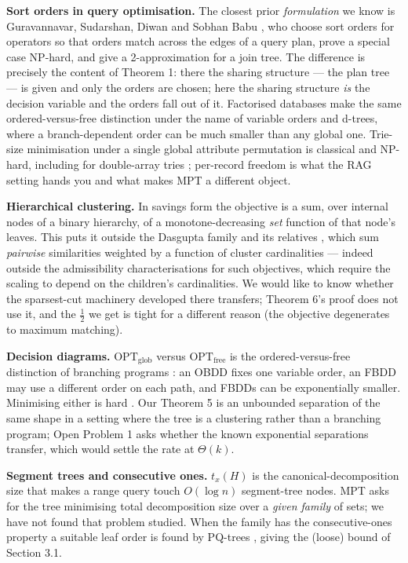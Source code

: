 \documentclass[11pt]{article}
\theoremstyle{plain}
\begin{document}
\textbf{Sort orders in query optimisation.} The closest prior \emph{formulation} we know is Guravannavar, Sudarshan, Diwan and Sobhan Babu \cite{GSD06}, who choose sort orders for operators so that orders match across the edges of a query plan, prove a special case NP-hard, and give a 2-approximation for a join tree. The difference is precisely the content of Theorem 1: there the sharing structure --- the plan tree --- is given and only the orders are chosen; here the sharing structure \emph{is} the decision variable and the orders fall out of it. Factorised databases \cite{OZ15} make the same ordered-versus-free distinction under the name of variable orders and d-trees, where a branch-dependent order can be much smaller than any global one. Trie-size minimisation under a single global attribute permutation is classical and NP-hard, including for double-array tries \cite{KAN24}; per-record freedom is what the RAG setting hands you and what makes MPT a different object.

\textbf{Hierarchical clustering.} In savings form the objective is a sum, over internal nodes of a binary hierarchy, of a monotone-decreasing \emph{set} function of that node's leaves. This puts it outside the Dasgupta family \cite{DAS16} and its relatives \cite{CC17,MW17,CKM19}, which sum \emph{pairwise} similarities weighted by a function of cluster cardinalities --- indeed outside the admissibility characterisations for such objectives, which require the scaling to depend on the children's cardinalities. We would like to know whether the sparsest-cut machinery developed there transfers; Theorem 6's proof does not use it, and the $\tfrac12$ we get is tight for a different reason (the objective degenerates to maximum matching).

\textbf{Decision diagrams.} $\mathrm{OPT}_{\mathrm{glob}}$ versus $\mathrm{OPT}_{\mathrm{free}}$ is the ordered-versus-free distinction of branching programs \cite{BRY86,WEG00}: an OBDD fixes one variable order, an FBDD may use a different order on each path, and FBDDs can be exponentially smaller. Minimising either is hard \cite{SIE02}. Our Theorem 5 is an unbounded separation of the same shape in a setting where the tree is a clustering rather than a branching program; Open Problem 1 asks whether the known exponential separations transfer, which would settle the rate at $\Theta(k)$.

\textbf{Segment trees and consecutive ones.} $t_x(H)$ is the canonical-decomposition size that makes a range query touch $O(\log n)$ segment-tree nodes. MPT asks for the tree minimising total decomposition size over a \emph{given family} of sets; we have not found that problem studied. When the family has the consecutive-ones property a suitable leaf order is found by PQ-trees \cite{BL76}, giving the (loose) bound of Section 3.1.
\end{document}

